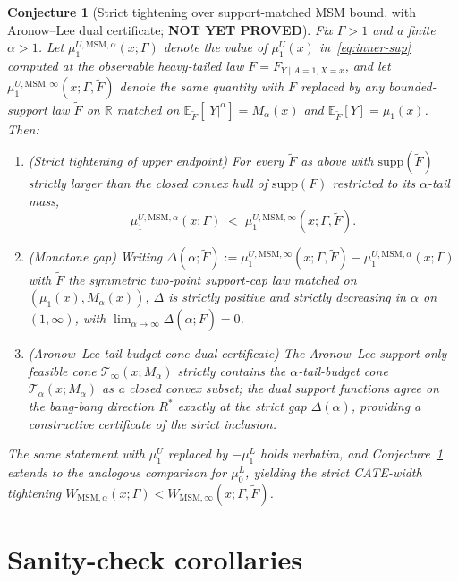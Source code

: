\documentclass[11pt]{article}
\newcommand{\E}{\mathbb{E}}
\newcommand{\R}{\mathbb{R}}
\theoremstyle{definition}
\theoremstyle{plain}
\newtheorem{conjecture}{Conjecture}
\theoremstyle{remark}
\begin{document}
\begin{conjecture}[Strict tightening over support-matched MSM bound, with Aronow--Lee dual certificate; \textbf{NOT YET PROVED}]\label{conj:al-tightening}
Fix $\Gamma > 1$ and a finite $\alpha > 1$. Let $\mu_1^{U,\mathrm{MSM},\alpha}(x; \Gamma)$ denote the value of $\mu_1^U(x)$ in~\eqref{eq:inner-sup} computed at the observable heavy-tailed law $F = F_{Y \mid A=1, X=x}$, and let $\mu_1^{U, \mathrm{MSM}, \infty}(x; \Gamma, \tilde F)$ denote the same quantity with $F$ replaced by any bounded-support law $\tilde F$ on $\R$ matched on $\E_{\tilde F}[|Y|^\alpha] = M_\alpha(x)$ and $\E_{\tilde F}[Y] = \mu_1(x)$. Then:
\begin{enumerate}[label=(\roman*)]
  \item (Strict tightening of upper endpoint) For every $\tilde F$ as above with $\mathrm{supp}(\tilde F)$ strictly larger than the closed convex hull of $\mathrm{supp}(F)$ restricted to its $\alpha$-tail mass,
    \[ \mu_1^{U, \mathrm{MSM}, \alpha}(x; \Gamma) \;<\; \mu_1^{U, \mathrm{MSM}, \infty}(x; \Gamma, \tilde F). \]
  \item (Monotone gap) Writing $\Delta(\alpha; \tilde F) := \mu_1^{U, \mathrm{MSM}, \infty}(x; \Gamma, \tilde F) - \mu_1^{U, \mathrm{MSM}, \alpha}(x; \Gamma)$ with $\tilde F$ the symmetric two-point support-cap law matched on $(\mu_1(x), M_\alpha(x))$, $\Delta$ is strictly positive and strictly decreasing in $\alpha$ on $(1, \infty)$, with $\lim_{\alpha \to \infty} \Delta(\alpha; \tilde F) = 0$.
  \item (Aronow--Lee tail-budget-cone dual certificate) The Aronow--Lee \citep[Thm.~1]{AronowLee2013} support-only feasible cone $\mathcal{T}_\infty(x; M_\alpha)$ strictly contains the $\alpha$-tail-budget cone $\mathcal{T}_\alpha(x; M_\alpha)$ as a closed convex subset; the dual support functions agree on the bang-bang direction $R^*$ exactly at the strict gap $\Delta(\alpha)$, providing a constructive certificate of the strict inclusion.
\end{enumerate}
The same statement with $\mu_1^U$ replaced by $-\mu_1^L$ holds verbatim, and Conjecture~\ref{conj:al-tightening} extends to the analogous comparison for $\mu_0^L$, yielding the strict CATE-width tightening $W_{\mathrm{MSM},\alpha}(x;\Gamma) < W_{\mathrm{MSM},\infty}(x;\Gamma, \tilde F)$.
\end{conjecture}

\section{Sanity-check corollaries}
\end{document}
